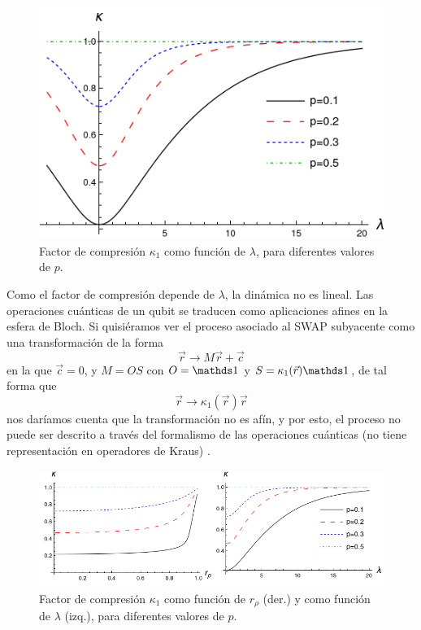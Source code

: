 \begin{figure}[h!]
  \centering
  \includegraphics[width=0.6\linewidth]{maxent/figures/ContractionFactorSWAP_2D_lambda0to8.png}
  \caption{Factor de compresión $\kappa_{1}$ como función de $\lambda$, para diferentes valores de $p$.}
  \label{fig:SWAPFactor2D}
\end{figure}

Como el factor de compresión depende de $\lambda$, la dinámica no es lineal. Las operaciones cuánticas de un qubit se traducen como aplicaciones afines en la esfera de Bloch. Si quisiéramos ver el proceso asociado al \textsc{SWAP} subyacente como una transformación de la forma
\begin{equation*}
  \vec{r}\rightarrow M\vec{r}+\vec{c}
\end{equation*}
en la que $\vec{c}=0$, y $M=OS$ con $O=\Id$ y $S=\kappa_{1}(\vec{r})\Id$, de tal forma que
\begin{equation*}
  \vec{r}\rightarrow \kappa_{1}(\vec{r})\vec{r}
\end{equation*}
nos daríamos cuenta que la transformación no es afín, y por esto, el proceso no puede ser descrito a través del formalismo de las operaciones cuánticas (no tiene representación en operadores de Kraus) \cite{Chuang}.
  \begin{figure}[h!]
    \centering
    \includegraphics[width=0.9\linewidth]{maxent/figures/ContractionFactorSWAP_2D_both.png}
    \caption{Factor de compresión $\kappa_{1}$ como función de $r_{\rho}$ (der.) y como función de $\lambda$ (izq.), para diferentes valores de $p$.}
    \label{fig:SWAPFactor2Drl}
  \end{figure}
